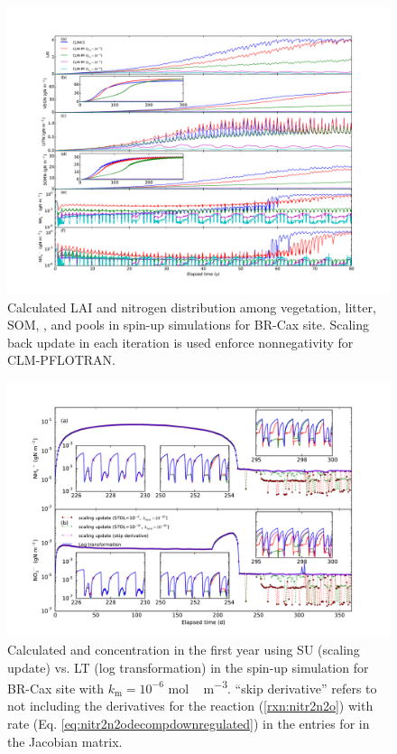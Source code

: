 \documentclass[gmd, manuscript]{copernicus}
\begin{document}
\begin{figure}[t]
\includegraphics[width=1.0\textwidth]{../figs/fig13/cax300y.pdf}
\caption{Calculated LAI and nitrogen distribution among vegetation, litter,
SOM,  , and  pools in spin-up simulations for BR-Cax
site. Scaling back update in each iteration is used enforce nonnegativity for
CLM-PFLOTRAN.}
\label{fig:cax300y}
\end{figure}

\begin{figure}[t]
\includegraphics[width=1.0\textwidth]{../figs/fig14/cax1y2.pdf}
\caption{Calculated  and  concentration in the first
year using SU (scaling update) vs. LT (log transformation) in the spin-up
simulation for BR-Cax site with $k_\text{m} = 10^{-6}$ \unit{mol\,m^{-3}}.
``skip derivative'' refers to not including the derivatives for the reaction
(\ref{rxn:nitr2n2o}) with rate (Eq. \ref{eq:nitr2n2odecompdownregulated}) in
the entries for  in the Jacobian matrix.}
\label{fig:cax1y}
\end{figure}
\end{document}
